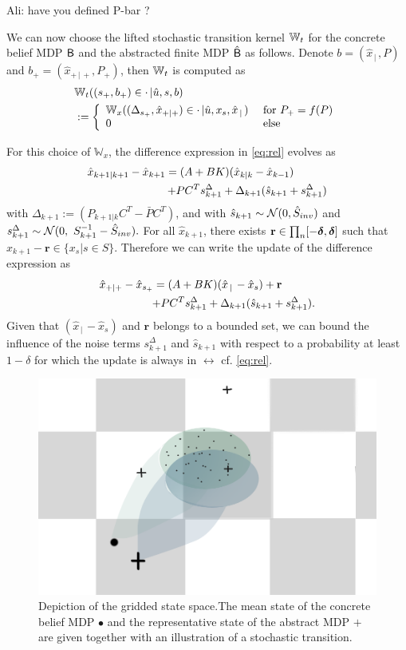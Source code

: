 \documentclass{ifacconf}
\renewcommand{\axx}[1]{{\color{orange} Ali: #1}}
\begin{document}
\axx{have you defined P-bar ?}

We can now choose the lifted stochastic transition kernel 	$\Wt$ for the concrete belief MDP $\MB$ and the abstracted finite MDP $\hat\MB$ as follows.
Denote $b=(\hat x_{\,|\,}, P)$ and $b_+=(\hat x_{+\,|\,+}, P_+)$, then 	$\Wt$ is computed as 
 \begin{align*}
 &	\Wt((s_+,b_+)\in \cdot\,| \hat u, s ,b)\\&:= \left\{\begin{array}{ll} \mathbb W_{x}((\Delta_{s_+}, \hat x_{+|+})\in \cdot\,|  \hat u,x_s , \hat x_{\,|\,}) &\text{ for }  P_+=f(P)\\
 	0 & \text{ else } \end{array}\right.
 \end{align*}

For this choice of  	$\mathbb W_x$, the difference expression in \eqref{eq:rel} evolves   as 
\begin{align}
 \hat x_{k+1|k+1}-	\hat x_{k+1}=(A+BK)(\hat x_{k|k}-\hat x_{k-1})\qquad \quad\notag\\+  \bar P   C^T s^\Delta_{k+1} +\Delta_{k+1}( \hat{s}_{k+1}+ s^\Delta_{k+1})\label{eq:beliefx2}
\end{align}
 with $\Delta_{k+1}:=(P_{k+1|k}C^T-  \bar P   C^T)$, and with $ \hat{s}_{k+1}\sim \CA N (0,\hat{S}_{inv})$ and $ s^\Delta_{k+1}\sim  \CA N (0,\  S_{k+1}^{-1}-\hat{S}_{inv}). $
For all $ \hat x_{k+1}$, there exists $\mathbf  r \in \prod_n[-\grid ,\grid]$ such that   $\hat x_{k+1}-\mathbf r \in \{x_s| s \in S\}$. Therefore we can write the update of the difference expression as  \begin{align}
 \hat x_{+|+}-	\hat x_{s_+}=(A+BK)(\hat x_{\,|\,}-\hat x_s)+\mathbf r\qquad \quad\notag\\+  \bar P   C^T s^\Delta_{k+1} +\Delta_{k+1}( \hat{s}_{k+1}+ s^\Delta_{k+1})\label{eq:beliefx2}.
\end{align}
Given that $(\hat x_{\,|\,}-\hat x_s)$ and  $\mathbf r$ belongs to a bounded set, we can bound the influence of the noise terms $s^\Delta_{k+1}$ and $ \hat{s}_{k+1}$ with respect to a probability at least $1-\delta$ for which the update is always in $\rel$ cf.  \eqref{eq:rel}.

\begin{figure}[htp]
\centering
	\includegraphics[width = .8\columnwidth]{figs/grid}
	\caption{Depiction of the gridded state space.The mean state of the concrete belief MDP $\bullet$ and the  representative state of the abstract MDP $\boldsymbol{+}$ are given together with an illustration of a stochastic transition. }
\end{figure}
\end{document}
